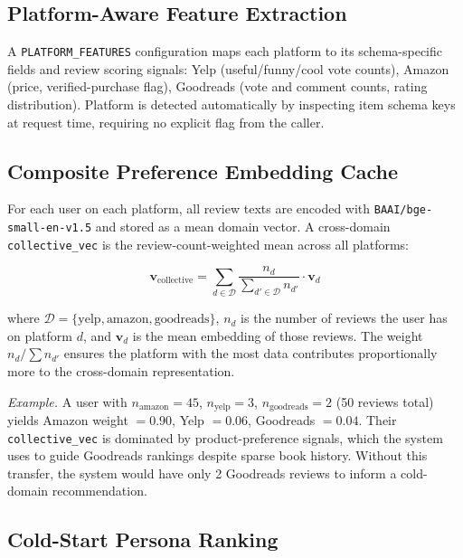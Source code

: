 \documentclass[11pt]{article}
\begin{document}
\subsection{Platform-Aware Feature Extraction}

A \texttt{PLATFORM\_FEATURES} configuration maps each platform to its
schema-specific fields and review scoring signals:
Yelp (useful/funny/cool vote counts), Amazon (price, verified-purchase flag),
Goodreads (vote and comment counts, rating distribution).
Platform is detected automatically by inspecting item schema keys at request
time, requiring no explicit flag from the caller.

\subsection{Composite Preference Embedding Cache}
\label{sec:cache}

For each user on each platform, all review texts are encoded with
\texttt{BAAI/bge-small-en-v1.5} and stored as a mean domain vector.
A cross-domain \texttt{collective\_vec} is the review-count-weighted mean
across all platforms:

\begin{equation}
\mathbf{v}_\text{collective}
= \sum_{d \in \mathcal{D}}
  \frac{n_d}{\sum_{d' \in \mathcal{D}} n_{d'}}
  \cdot \mathbf{v}_d
\label{eq:collective}
\end{equation}

where $\mathcal{D} = \{\text{yelp}, \text{amazon}, \text{goodreads}\}$,
$n_d$ is the number of reviews the user has on platform $d$, and
$\mathbf{v}_d$ is the mean embedding of those reviews.
The weight $n_d / \sum n_{d'}$ ensures the platform with the most data
contributes proportionally more to the cross-domain representation.

\smallskip\noindent\textit{Example.}
A user with $n_\text{amazon} = 45$, $n_\text{yelp} = 3$,
$n_\text{goodreads} = 2$ (50 reviews total) yields
Amazon weight $= 0.90$, Yelp $= 0.06$, Goodreads $= 0.04$.
Their \texttt{collective\_vec} is dominated by product-preference signals,
which the system uses to guide Goodreads rankings despite sparse book history.
Without this transfer, the system would have only 2 Goodreads reviews to
inform a cold-domain recommendation.

\subsection{Cold-Start Persona Ranking}
\end{document}
